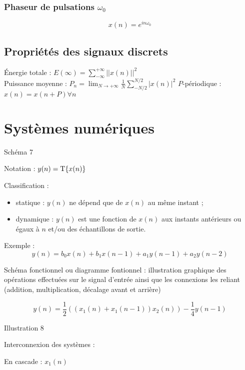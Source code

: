 \documentclass[a4paper,12pt]{article}
\begin{document}
\subsubsection{Phaseur de pulsations $\omega_0$}

\[ x(n) = e^{in\omega_0} \]

\subsection{Propriétés des signaux discrets}

Énergie totale : $E(\infty) = \sum_{-\infty}^{+\infty} ||x(n)||^2$ \\
Puissance moyenne : $P_n = \lim_{N \to +\infty} \frac{1}{N} \sum_{-N/2}^{N/2} |x(n)|^2$
$P$-périodique : $x(n) = x(n+P) \forall n$

\section{Systèmes numériques}

{\Large Schéma 7}

Notation : $y(n) = \mathrm{T} \{ x(n) \}$

Classification :

\begin{itemize}
    \item statique : $y(n)$ ne dépend que de $x(n)$ au même instant ;
    \item dynamique : $y(n)$ est une fonction de $x(n)$ aux instants antérieurs ou égaux à $n$ et/ou des échantillons de sortie.
\end{itemize}

Exemple :
\[ y(n) = b_0 x(n) + b_1 x(n-1) + a_1 y(n-1) + a_2 y(n-2) \]

Schéma fonctionnel ou diagramme fontionnel : illustration graphique des opérations effectuées sur le signal d'entrée ainsi que les connexions les reliant (addition, multiplication, décalage avant et arrière)

\[ y(n) = \frac{1}{2} ((x_1(n) + x_1(n-1))x_2(n)) - \frac{1}{4} y(n-1) \]

{\Large Illustration 8}

Interconnexion des systèmes :

En cascade : $x_1(n)$
\end{document}
